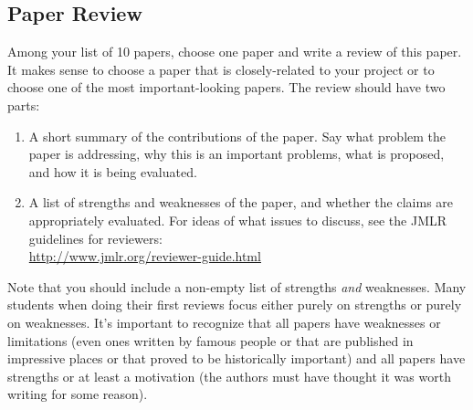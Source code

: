 \documentclass{article}
\def\blu#1{{\color{blu}#1}}
\def\enum#1{\begin{enumerate}#1\end{enumerate}}
\begin{document}
\subsection{Paper Review}

Among your list of 10 papers, choose one paper and \blu{write a review of this paper}. It makes sense to choose a paper that is closely-related to your project or to choose one of the most important-looking papers. The review should have two parts:
\enum{
\item A short summary of the contributions of the paper. Say what problem the paper is addressing, why this is an important problems, what is proposed, and how it is being evaluated.
\item A list of strengths and weaknesses of the paper, and whether the claims are appropriately evaluated. For ideas of what issues to discuss, see the JMLR guidelines for reviewers:\\
\url{http://www.jmlr.org/reviewer-guide.html}
}
Note that you should include a non-empty list of strengths \emph{and} weaknesses. 
Many students when doing their first reviews focus either purely on strengths or purely on weaknesses. It's important to recognize that all papers have weaknesses or limitations (even ones written by famous people or that are published in impressive places or that proved to be historically important) and all papers have strengths or at least a motivation (the authors must have thought it was worth writing for some reason).


 
\end{document}
